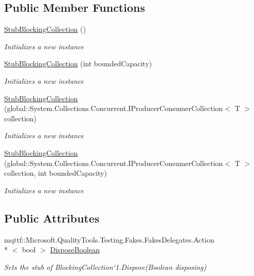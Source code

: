 \subsection*{Public Member Functions}
\begin{DoxyCompactItemize}
\item 
\hyperlink{class_system_1_1_collections_1_1_concurrent_1_1_fakes_1_1_stub_blocking_collection_3_01_t_01_4_a034cfeca08917cdafd3a96e148e6a0bf}{Stub\-Blocking\-Collection} ()
\begin{DoxyCompactList}\small\item\em Initializes a new instance\end{DoxyCompactList}\item 
\hyperlink{class_system_1_1_collections_1_1_concurrent_1_1_fakes_1_1_stub_blocking_collection_3_01_t_01_4_a63e3ca8203da4c53eaa70e00978e3af1}{Stub\-Blocking\-Collection} (int bounded\-Capacity)
\begin{DoxyCompactList}\small\item\em Initializes a new instance\end{DoxyCompactList}\item 
\hyperlink{class_system_1_1_collections_1_1_concurrent_1_1_fakes_1_1_stub_blocking_collection_3_01_t_01_4_a9d3a788cb0966e4a1fcf1e75822c188f}{Stub\-Blocking\-Collection} (global\-::\-System.\-Collections.\-Concurrent.\-I\-Producer\-Consumer\-Collection$<$ T $>$ collection)
\begin{DoxyCompactList}\small\item\em Initializes a new instance\end{DoxyCompactList}\item 
\hyperlink{class_system_1_1_collections_1_1_concurrent_1_1_fakes_1_1_stub_blocking_collection_3_01_t_01_4_a9eef881691cd958e55c6ad6288e0cc23}{Stub\-Blocking\-Collection} (global\-::\-System.\-Collections.\-Concurrent.\-I\-Producer\-Consumer\-Collection$<$ T $>$ collection, int bounded\-Capacity)
\begin{DoxyCompactList}\small\item\em Initializes a new instance\end{DoxyCompactList}\end{DoxyCompactItemize}
\subsection*{Public Attributes}
\begin{DoxyCompactItemize}
\item 
mqttf\-::\-Microsoft.\-Quality\-Tools.\-Testing.\-Fakes.\-Fakes\-Delegates.\-Action\\*
$<$ bool $>$ \hyperlink{class_system_1_1_collections_1_1_concurrent_1_1_fakes_1_1_stub_blocking_collection_3_01_t_01_4_a8f3d6ca1ae2c5818d8cbfabd89f44d79}{Dispose\-Boolean}
\begin{DoxyCompactList}\small\item\em Sets the stub of Blocking\-Collection`1.Dispose(\-Boolean disposing)\end{DoxyCompactList}\end{DoxyCompactItemize}
